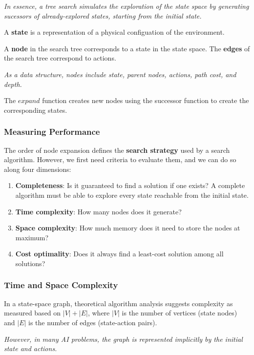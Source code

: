 \emph{In essence, a tree search simulates the exploration of the state space by generating sucessors of already-explored states, starting from the initial state.}

A \textbf{state} is a representation of a physical configuation of the environment.

A \textbf{node} in the search tree corresponds to a state in the state space. The \textbf{edges} of the search tree correspond to actions.

\emph{As a data structure, nodes include state, parent nodes, actions, path cost, and depth.}

The $expand$ function creates new nodes using the successor function to create the corresponding states.


\subsubsection{Measuring Performance}

The order of node expansion defines the \textbf{search strategy} used by a search algorithm.
However, we first need criteria to evaluate them, and we can do so along four dimensions:

\begin{enumerate}[leftmargin=*]
    \item \textbf{Completeness}: Is it guaranteed to find a solution if one exists? A complete algorithm must be able to explore every state reachable from the initial state.
    \item \textbf{Time complexity}: How many nodes does it generate?
    \item \textbf{Space complexity}: How much memory does it need to store the nodes at maximum?
    \item \textbf{Cost optimality}: Does it always find a least-cost solution among all solutions?
\end{enumerate}


\subsubsection{Time and Space Complexity}

In a state-space graph, theoretical algorithm analysis suggests complexity as measured based on $|V| + |E|$, where $|V|$ is the number of vertices (state nodes) and $|E|$ is the number of edges (state-action pairs).

\emph{However, in many AI problems, the graph is represented implicitly by the initial state and actions.}

